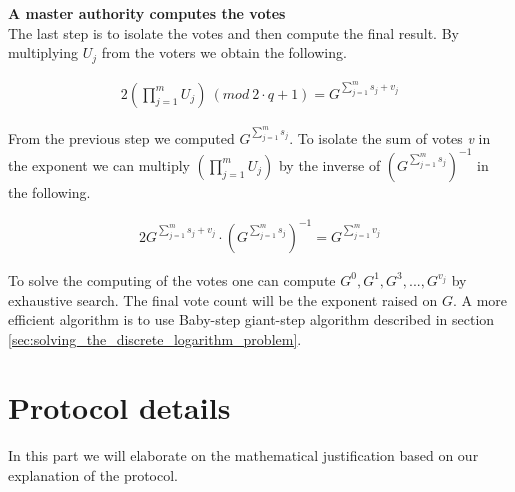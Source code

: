 \noindent
\textbf{A master authority computes the votes}\\
The last step is to isolate the votes and then compute the final result. By multiplying \begin{math}U_j \end{math} from the voters we obtain the following.

\begin{alignat*}{2}
(\prod\limits_{j=1}^{m} U_{j}) \ (mod \ 2 \cdot q+1)=  G^{ \sum\limits_{j=1}^m s_j +v_j}
\end{alignat*}

\noindent
From the previous step we computed $G^{ \sum\limits_{j=1}^m s_j}$. To  isolate the sum of votes \textit{v} in the exponent we can multiply  $(\prod\limits_{j=1}^{m} U_{j})$ by the inverse of $(G^{ \sum\limits_{j=1}^m s_j})^{-1}$ in the following.

\begin{alignat*}{2}
 G^{ \sum\limits_{j=1}^m s_j +v_j} \cdot (G^{ \sum\limits_{j=1}^m s_j})^{-1} = G^{ \sum\limits_{j=1}^m v_j}
\end{alignat*}


\noindent
To solve the computing of the votes one can compute \begin{math}G^0, G^1, G^3,..., G^{v_j} \end{math} by exhaustive search. The final vote count will be the exponent raised on $G$. A more efficient algorithm is to use Baby-step giant-step algorithm described in section \ref{sec:solving_the_discrete_logarithm_problem}. 

\section{Protocol details} \label{sec:protocol_details}
In this part we will elaborate on the mathematical justification based on our explanation of the protocol.  


